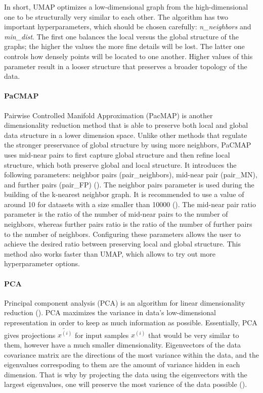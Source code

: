 In short, UMAP optimizes a low-dimensional graph from the high-dimensional one to be structurally very similar to each other. The algorithm has two important hyperparameters, which should be chosen carefully: \textit{n\_neighbors} and \textit{min\_dist}. The first one balances the local versus the global structure of the graphs; the higher the values the more fine details will be lost. The latter one controls how densely points will be located to one another. Higher values of this parameter result in a looser structure that preserves a broader topology of the data. 

\paragraph{PaCMAP}\label{section:pacmap}
Pairwise Controlled Manifold Approximation (PacMAP) is another dimensionality reduction method that is able to preserve both local and global data structure in a lower dimension space. Unlike other methods that regulate the stronger preservance of global structure by using more neighbors, PaCMAP uses mid-near pairs to first capture global structure and then refine local structure, which both preserve global and local structure. It introduces the following parameters: neighbor pairs (pair\_neighbors), mid-near pair (pair\_MN), and further pairs (pair\_FP) (\cite{Wang_2021}). The neighbor pairs parameter is used during the building of the k-nearest neighbor graph. It is recommended to use a value of around 10 for datasets with a size smaller than 10000 (\cite{Yingfan_git}). The mid-near pair ratio parameter is the ratio of the number of mid-near pairs to the number of neighbors, whereas further pairs ratio is the ratio of the number of further pairs to the number of neighbors. Configuring these parameters allows the user to achieve the desired ratio between preserving local and global structure. This method also works faster than UMAP, which allows to try out more hyperparameter options.

\paragraph{PCA}
Principal component analysis (PCA) is an algorithm for linear dimensionality reduction (\cite{Pearson_1901}).  PCA maximizes the variance in data's low-dimensional representation in order to keep as much information as possible. Essentially, PCA gives projections $\tilde{x^{(i)}}$ for input samples $x^{(i)}$ that would be very similar to them, however have a much smaller dimensionality. Eigenvectors of the data covariance matrix are the directions of the most variance within the data, and the eigenvalues correspoding to them are the amount of variance hidden in each dimension. That is why by projecting the data using the eigenvectors with the largest eigenvalues, one will preserve the most varience of the data possible (\cite{mml_book}).

